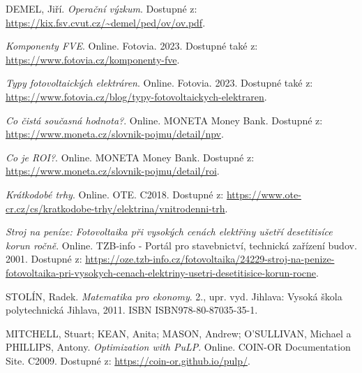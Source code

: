 \begin{thebibliography}{9}
    DEMEL, Jiří. \textit{Operační výzkum}. Dostupné z: \url{https://kix.fsv.cvut.cz/~demel/ped/ov/ov.pdf}.
    
    \textit{Komponenty FVE}. Online. Fotovia. 2023. Dostupné také z: \url{https://www.fotovia.cz/komponenty-fve}.
    
    \textit{Typy fotovoltaických elektráren}. Online. Fotovia. 2023. Dostupné také z: \url{https://www.fotovia.cz/blog/typy-fotovoltaickych-elektraren}.
    
    \textit{Co čistá současná hodnota?}. Online. MONETA Money Bank. Dostupné z: \url{https://www.moneta.cz/slovnik-pojmu/detail/npv}.
    
    \textit{Co je ROI?}. Online. MONETA Money Bank. Dostupné z: \url{https://www.moneta.cz/slovnik-pojmu/detail/roi}.
    
    \textit{Krátkodobé trhy}. Online. OTE. C2018. Dostupné z: \url{https://www.ote-cr.cz/cs/kratkodobe-trhy/elektrina/vnitrodenni-trh}.
    
    \textit{Stroj na peníze: Fotovoltaika při vysokých cenách elektřiny ušetří desetitisíce korun ročně}. Online. TZB-info - Portál pro stavebnictví, technická zařízení budov. 2001. Dostupné z: \url{https://oze.tzb-info.cz/fotovoltaika/24229-stroj-na-penize-fotovoltaika-pri-vysokych-cenach-elektriny-usetri-desetitisice-korun-rocne}.

    STOLÍN, Radek. \textit{Matematika pro ekonomy}. 2., upr. vyd. Jihlava: Vysoká škola polytechnická Jihlava, 2011. ISBN ISBN978-80-87035-35-1.

    MITCHELL, Stuart; KEAN, Anita; MASON, Andrew; O'SULLIVAN, Michael a PHILLIPS, Antony. \textit{Optimization with PuLP}. Online. COIN-OR Documentation Site. C2009. Dostupné z: \url{https://coin-or.github.io/pulp/}.
    
\end{thebibliography}